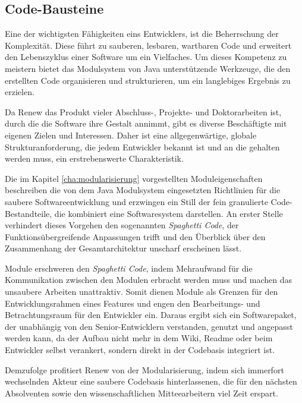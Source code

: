 \subsection{Code-Bausteine}\label{sub:cbs}


Eine der wichtigsten Fähigkeiten eins Entwicklers, ist die Beherrschung der Komplexität. Diese führt zu sauberen, lesbaren, wartbaren Code und erweitert den Lebenszyklus einer Software um ein Vielfaches. Um dieses Kompetenz zu meistern bietet das Modulsystem von Java unterstützende Werkzeuge, die den erstellten Code organisieren und strukturieren, um ein langlebiges Ergebnis zu erzielen. 


Da Renew das Produkt vieler Abschluss-, Projekte- und Doktorarbeiten ist, durch die die Software ihre Gestalt annimmt, gibt es diverse Beschäftigte mit eigenen Zielen und Interessen. Daher ist eine allgegenwärtige, globale Strukturanforderung, die jedem Entwickler bekannt ist und an die gehalten werden muss, ein erstrebenswerte Charakteristik. 


Die im Kapitel \ref{cha:modularisierung} vorgestellten Moduleigenschaften beschreiben die von dem Java Modulsystem eingesetzten Richtlinien für die saubere Softwareentwicklung und erzwingen ein Still der fein granulierte Code-Bestandteile, die kombiniert eine Softwaresystem darstellen. An erster Stelle verhindert dieses Vorgehen den sogenannten \textit{Spaghetti Code}, der Funktionsübergreifende Anpassungen trifft und den Überblick über den Zusammenhang der Gesamtarchitektur unscharf erscheinen lässt. 


Module erschweren den \textit{Spaghetti Code}, indem Mehraufwand für die Kommunikation zwischen den Modulen erbracht werden muss und machen das unsaubere Arbeiten unattraktiv. Somit dienen Module als Grenzen für den Entwicklungsrahmen eines Features und engen den Bearbeitungs- und Betrachtungsraum für den Entwickler ein. Daraus ergibt sich ein Softwarepaket, der unabhängig von den Senior-Entwicklern verstanden, genutzt und angepasst werden kann, da der Aufbau nicht mehr in dem Wiki, Readme oder beim Entwickler selbst verankert, sondern direkt in der Codebasis integriert ist. 


Demzufolge profitiert Renew von der Modularisierung, indem sich immerfort wechselnden Akteur eine saubere Codebasis hinterlassenen, die für den nächsten Absolventen sowie den wissenschaftlichen Mitteearbeitern viel Zeit erspart. \bigbreak


